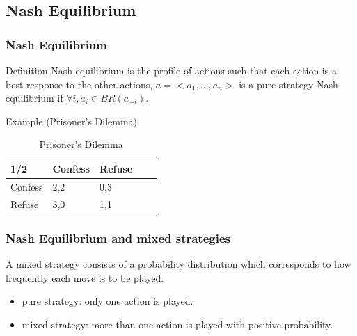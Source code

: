 \documentclass[aspectratio=169]{beamer}
\begin{document}
\subsection{Nash Equilibrium}
\begin{frame}

  \frametitle{Nash Equilibrium}  
\begin{block}{Definition} Nash equilibrium is the profile of actions such that each action is a best response to the other actions, 
$a = <a_1,...,a_n>$ is a pure strategy Nash equilibrium if $\forall i, a_i \in BR(a_{-i})$.\end{block}\pause
\begin{exampleblock}{Example (Prisoner's Dilemma)}
\begin{table}[h!]
\centering
\begin{tabular}{lllll}

\multicolumn{1}{l}{1/2} \vline  & \multicolumn{1}{l}{Confess} & \multicolumn{1}{l}{Refuse}  \\ 
\hline
Confess                       & \alert{2,2}                                  & 0,3				
\\
Refuse                          &3,0                                    & 1,1                                     
                                      
\end{tabular}
\caption{Prisoner's Dilemma}
\label{table:7}
\end{table}
  
\end{exampleblock}
\end{frame}
\begin{frame}

  \frametitle{Nash Equilibrium and mixed strategies}   %
A mixed strategy consists of a probability distribution which corresponds to how frequently each move is to be played.
	\begin{itemize}
	\item<1-> pure strategy: only one action is played.
	\item<2-> mixed strategy: more than one action is played with positive probability.
	\end{itemize}
\end{frame}
\end{document}
